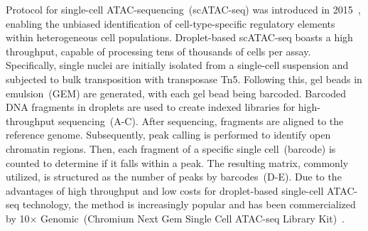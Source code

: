 Protocol for single-cell ATAC-sequencing~(scATAC-seq) was introduced in 2015~\citep{Buenrostro2015,cusanovich2015multiplex}, enabling the unbiased identification of cell-type-specific regulatory elements within heterogeneous cell populations. Droplet-based scATAC-seq boasts a high throughput, capable of processing tens of thousands of cells per assay. Specifically, single nuclei are initially isolated from a single-cell suspension and subjected to bulk transposition with transposase Tn5. Following this, gel beads in emulsion~(GEM) are generated, with each gel bead being barcoded. Barcoded DNA fragments in droplets are used to create indexed libraries for high-throughput sequencing~(A-C). After sequencing, fragments are aligned to the reference genome. Subsequently, peak calling is performed to identify open chromatin regions. Then, each fragment of a specific single cell~(barcode) is counted to determine if it falls within a peak. The resulting matrix, commonly utilized, is structured as the number of peaks by barcodes~(D-E). Due to the advantages of high throughput and low costs for droplet-based single-cell ATAC-seq technology, the method is increasingly popular and has been commercialized by 10$\times$ Genomic~(Chromium Next Gem Single Cell ATAC-seq Library Kit)~\citep{satpathy2019massively}.


